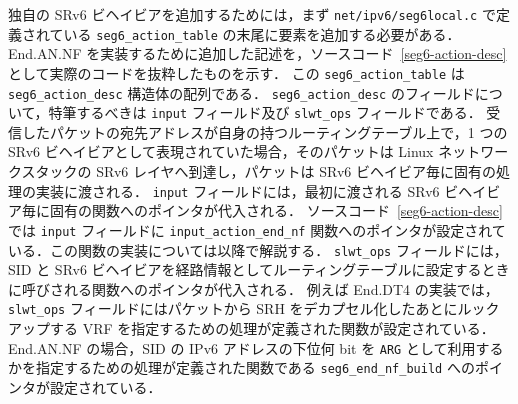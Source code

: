 独自の SRv6 ビヘイビアを追加するためには，まず \texttt{net/ipv6/seg6local.c} で定義されている \texttt{seg6\_action\_table} の末尾に要素を追加する必要がある．
End.AN.NF を実装するために追加した記述を，ソースコード~\ref*{seg6-action-desc} として実際のコードを抜粋したものを示す．
この \texttt{seg6\_action\_table} は \texttt{seg6\_action\_desc} 構造体の配列である．
\texttt{seg6\_action\_desc} のフィールドについて，特筆するべきは \texttt{input} フィールド及び \texttt{slwt\_ops} フィールドである．
受信したパケットの宛先アドレスが自身の持つルーティングテーブル上で，1 つの SRv6 ビヘイビアとして表現されていた場合，そのパケットは Linux ネットワークスタックの SRv6 レイヤへ到達し，パケットは SRv6 ビヘイビア毎に固有の処理の実装に渡される．
\texttt{input} フィールドには，最初に渡される SRv6 ビヘイビア毎に固有の関数へのポインタが代入される．
ソースコード~\ref*{seg6-action-desc} では \texttt{input} フィールドに \texttt{input\_action\_end\_nf} 関数へのポインタが設定されている．この関数の実装については以降で解説する．
\texttt{slwt\_ops} フィールドには，SID と SRv6 ビヘイビアを経路情報としてルーティングテーブルに設定するときに呼びされる関数へのポインタが代入される．
例えば End.DT4 の実装では，\texttt{slwt\_ops} フィールドにはパケットから SRH をデカプセル化したあとにルックアップする VRF を指定するための処理が定義された関数が設定されている．
End.AN.NF の場合，SID の IPv6 アドレスの下位何 bit を \texttt{ARG} として利用するかを指定するための処理が定義された関数である \texttt{seg6\_end\_nf\_build} へのポインタが設定されている．

